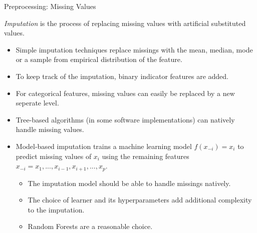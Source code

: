 \begin{frame}{Preprocessing: Missing Values}

	\textit{Imputation} is the process of replacing missing values with artificial substituted values.

	\vspace{0.5cm}

	\begin{itemize}
		\item Simple imputation techniques replace missings with the mean, median, mode or a sample from empirical distribution of the feature.
		\item To keep track of the imputation, binary indicator features are added.
		\item For categorical features, missing values can easily be replaced by a new seperate level.
		\item Tree-based algorithms (in some software implementations) can natively handle missing values.
		\item Model-based imputation trains a machine learning model $f(x_{-i}) = x_i$ to predict missing values of $x_i$ using the remaining features $x_{-i} = x_1, ..., x_{i-1}, x_{i+1}, ..., x_p$.
		\begin{itemize}
			\item The imputation model should be able to handle missings natively.
			\item The choice of learner and its hyperparameters add additional complexity to the imputation.
			\item Random Forests are a reasonable choice.
		\end{itemize}
	\end{itemize}

\end{frame}

